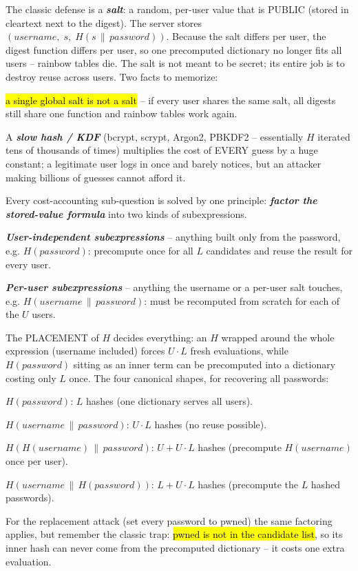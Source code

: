\documentclass[12pt, a4paper]{article}
\newcommand{\term}[1]{\textbf{\textit{#1}}}        %
\newcommand{\imp}[1]{\hl{#1}}                       %
\begin{document}
The classic defense is a \term{salt}: a random, per-user value that is PUBLIC (stored in cleartext next to the digest). The server stores $(username,\; s,\; H(s \,\|\, password))$. Because the salt differs per user, the digest function differs per user, so one precomputed dictionary no longer fits all users -- rainbow tables die. The salt is not meant to be secret; its entire job is to destroy reuse across users. Two facts to memorize:\begin{tightitem}\item \imp{a single global salt is not a salt} -- if every user shares the same salt, all digests still share one function and rainbow tables work again.\item A \term{slow hash / KDF} (bcrypt, scrypt, Argon2, PBKDF2 -- essentially $H$ iterated tens of thousands of times) multiplies the cost of EVERY guess by a huge constant; a legitimate user logs in once and barely notices, but an attacker making billions of guesses cannot afford it.\end{tightitem}

Every cost-accounting sub-question is solved by one principle: \term{factor the stored-value formula} into two kinds of subexpressions.\begin{tightitem}\item \term{User-independent subexpressions} -- anything built only from the password, e.g. $H(password)$: precompute once for all $L$ candidates and reuse the result for every user.\item \term{Per-user subexpressions} -- anything the username or a per-user salt touches, e.g. $H(username \,\|\, password)$: must be recomputed from scratch for each of the $U$ users.\end{tightitem}The PLACEMENT of $H$ decides everything: an $H$ wrapped around the whole expression (username included) forces $U \cdot L$ fresh evaluations, while $H(password)$ sitting as an inner term can be precomputed into a dictionary costing only $L$ once. The four canonical shapes, for recovering all passwords:\begin{tightitem}\item $H(password)$: $L$ hashes (one dictionary serves all users).\item $H(username \,\|\, password)$: $U \cdot L$ hashes (no reuse possible).\item $H(H(username) \,\|\, password)$: $U + U \cdot L$ hashes (precompute $H(username)$ once per user).\item $H(username \,\|\, H(password))$: $L + U \cdot L$ hashes (precompute the $L$ hashed passwords).\end{tightitem}For the replacement attack (set every password to pwned) the same factoring applies, but remember the classic trap: \imp{pwned is not in the candidate list}, so its inner hash can never come from the precomputed dictionary -- it costs one extra evaluation.
\end{document}
